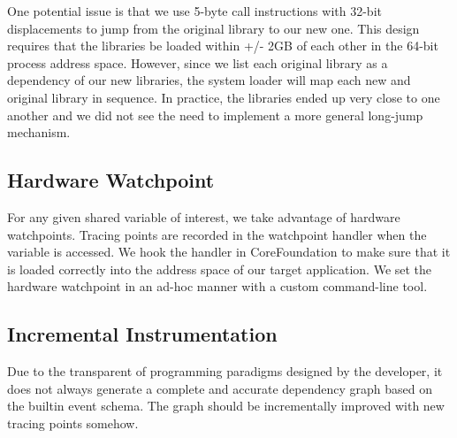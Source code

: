 One potential issue is that we use 5-byte call instructions with 32-bit displacements to jump from the original library to our new one.
This design requires that the libraries be loaded within +/- 2GB of each other in the 64-bit process address space.
However, since we list each original library as a dependency of our new libraries, the system loader will map each new and original library in sequence.
In practice, the libraries ended up very close to one another and we did not see the need to implement a more general long-jump mechanism.




\subsection{Hardware Watchpoint}
For any given shared variable of interest, we take advantage of hardware watchpoints.
Tracing points are recorded in the watchpoint handler when the variable is accessed.
We hook the handler in CoreFoundation to make sure that it is loaded correctly into the address space of our target application.
We set the hardware watchpoint in an ad-hoc manner with a custom command-line tool.

\subsection{Incremental Instrumentation}
Due to the transparent of programming paradigms designed by the developer, it does not always generate a complete and accurate dependency graph based on the builtin event schema.
The graph should be incrementally improved with new tracing points somehow.

